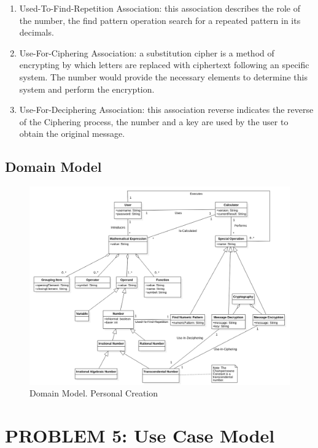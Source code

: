\documentclass{report}
\begin{document}
\begin{enumerate}
\item Used-To-Find-Repetition Association: this association describes the role of the number, the find pattern operation search for a repeated pattern in its decimals.\newline

\item Use-For-Ciphering Association: a substitution cipher is a method of encrypting by which letters are replaced with ciphertext following an specific system. The number would provide the necessary elements to determine this system and perform the encryption.\newline

\item Use-For-Deciphering Association: this association reverse indicates the reverse of the Ciphering process, the number and a key are used by the user to obtain the original message.\newline

\end{enumerate}

\subsection{Domain Model}

\begin{figure}[h]
\includegraphics[scale=0.46]{images/DomainModel.png}
\caption[Domain Model]{Domain Model. Personal Creation}
\end{figure}

\section{PROBLEM 5: Use Case Model}
\end{document}
